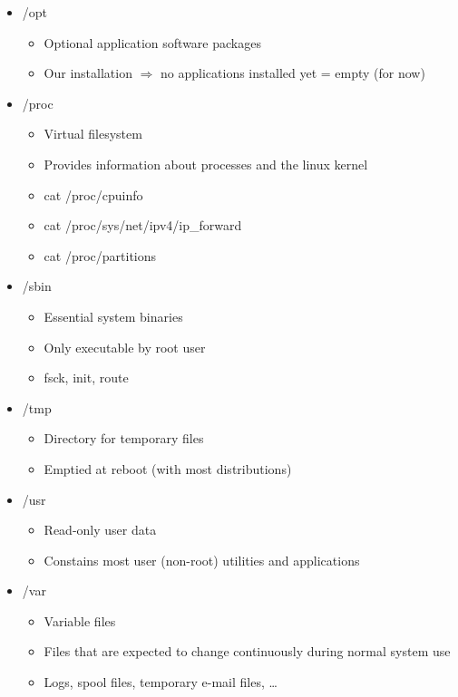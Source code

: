 \documentclass{article}
\begin{document}
\begin{itemize}
    \item /opt
    \begin{itemize}
        \item Optional application software packages
        \item Our installation $\Rightarrow$ no applications installed yet = empty (for now)
    \end{itemize}
    \item /proc
    \begin{itemize}
        \item Virtual filesystem
        \item Provides information about processes and the linux kernel
        \item cat /proc/cpuinfo
        \item cat /proc/sys/net/ipv4/ip\_forward
        \item cat /proc/partitions
    \end{itemize}
    \item /sbin
    \begin{itemize}
        \item Essential system binaries
        \item Only executable by root user
        \item fsck, init, route
    \end{itemize}
    \item /tmp
    \begin{itemize}
        \item Directory for temporary files
        \item Emptied at reboot (with most distributions)
    \end{itemize}
    \item /usr
    \begin{itemize}
        \item Read-only user data
        \item Constains most user (non-root) utilities and applications
    \end{itemize}
    \item /var
    \begin{itemize}
        \item Variable files
        \item Files that are expected to change continuously during normal system use
        \item Logs, spool files, temporary e-mail files, \dots
    \end{itemize}
\end{itemize}
\end{document}
